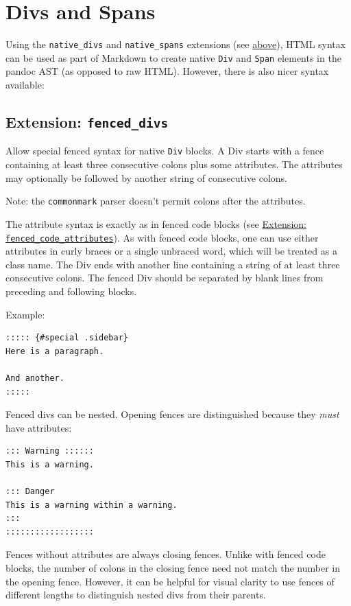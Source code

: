\documentclass[
  b5paper
]{book}
\begin{document}
\section{Divs and Spans}\label{divs-and-spans}

Using the \texttt{native\_divs} and \texttt{native\_spans} extensions
(see \hyperref[extension-native_divs]{above}), HTML syntax can be used
as part of Markdown to create native \texttt{Div} and \texttt{Span}
elements in the pandoc AST (as opposed to raw HTML). However, there is
also nicer syntax available:

\subsection{\texorpdfstring{Extension:
\texttt{fenced\_divs}}{Extension: fenced\_divs}}\label{extension-fenced_divs}

Allow special fenced syntax for native \texttt{Div} blocks. A Div starts
with a fence containing at least three consecutive colons plus some
attributes. The attributes may optionally be followed by another string
of consecutive colons.

Note: the \texttt{commonmark} parser doesn't permit colons after the
attributes.

The attribute syntax is exactly as in fenced code blocks (see
\hyperref[extension-fenced_code_attributes]{Extension:
\texttt{fenced\_code\_attributes}}). As with fenced code blocks, one can
use either attributes in curly braces or a single unbraced word, which
will be treated as a class name. The Div ends with another line
containing a string of at least three consecutive colons. The fenced Div
should be separated by blank lines from preceding and following blocks.

Example:

\begin{verbatim}
::::: {#special .sidebar}
Here is a paragraph.

And another.
:::::
\end{verbatim}

Fenced divs can be nested. Opening fences are distinguished because they
\emph{must} have attributes:

\begin{verbatim}
::: Warning ::::::
This is a warning.

::: Danger
This is a warning within a warning.
:::
::::::::::::::::::
\end{verbatim}

Fences without attributes are always closing fences. Unlike with fenced
code blocks, the number of colons in the closing fence need not match
the number in the opening fence. However, it can be helpful for visual
clarity to use fences of different lengths to distinguish nested divs
from their parents.
\end{document}
